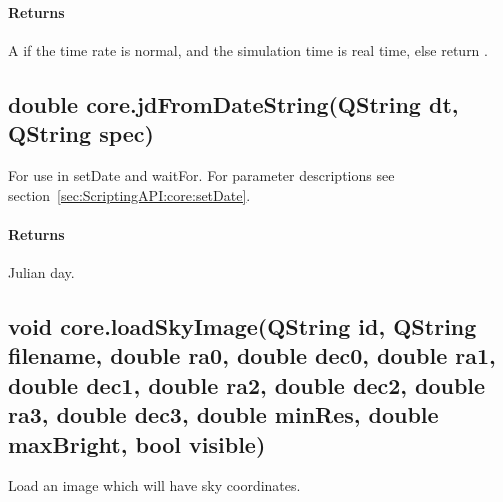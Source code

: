\paragraph{Returns}
A  if the time rate is normal, and the simulation time is real time, else return .

\subsection{double core.jdFromDateString(QString dt, QString spec)}
\label{sec:ScriptingAPI:core:jdFromDateString}
For use in setDate and waitFor. For parameter descriptions see section~\ref{sec:ScriptingAPI:core:setDate}.

\paragraph{Returns}
Julian day.

\subsection{void core.loadSkyImage(QString id, QString filename, double ra0, double dec0, double ra1, double dec1, double ra2, double dec2, double ra3, double dec3, double minRes, double maxBright, bool visible)}
\label{sec:ScriptingAPI:core:loadSkyImage}
Load an image which will have sky coordinates.

